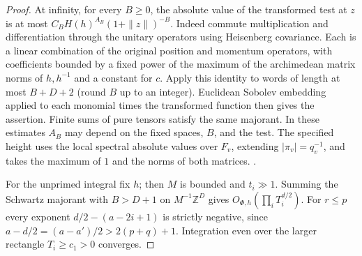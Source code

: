 \begin{proof}
At infinity, for every \(B\ge0\), the absolute value of the transformed
test at \(z\) is at most \(C_B H(h)^{A_B}(1+\|z\|)^{-B}\).
Indeed commute multiplication and differentiation through the unitary
operators using Heisenberg covariance. Each is a linear combination of
the original position and momentum operators, with coefficients
bounded by a fixed power of the maximum of the archimedean matrix
norms of \(h,h^{-1}\) and a constant for \(c\). Apply this identity to
words of length at most \(B+D+2\) (round \(B\) up to an integer).
Euclidean Sobolev embedding applied to each monomial times the
transformed function then gives the assertion. Finite sums of pure
tensors satisfy the same majorant. In these estimates \(A_B\) may
depend on the fixed spaces, \(B\), and the test. The specified height
uses the local spectral absolute values over \(F_v\), extending
\(|\pi_v|=q_v^{-1}\), and takes the maximum of \(1\) and the norms of
both matrices.
.

For the unprimed integral fix \(h\); then \(M\) is bounded and
\(t_i\gg1\). Summing the Schwartz majorant with \(B>D+1\) on
\(M^{-1}\mathbb Z^D\) gives \(O_{\Phi,h}(\prod_i T_i^{d/2})\).
For \(r\le p\) every exponent \(d/2-(a-2i+1)\) is strictly negative,
since \(a-d/2=(a-a')/2>2(p+q)+1\). Integration even over the larger
rectangle \(T_i\ge c_1>0\) converges.


\end{proof}
